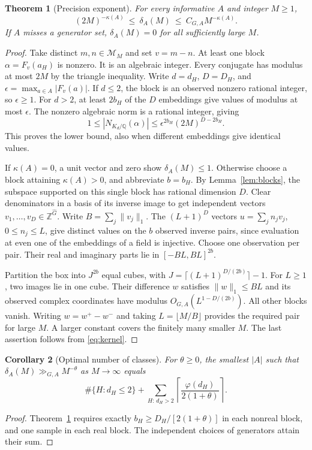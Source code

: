 \documentclass[11pt]{article}
\newtheorem{theorem}{Theorem}
\newtheorem{corollary}[theorem]{Corollary}
\newcommand{\Q}{\mathbb Q}
\newcommand{\Z}{\mathbb Z}
\newcommand{\calM}{\mathcal M}
\begin{document}
\newpage
\begin{theorem}[Precision exponent]\label{th:sep}
For every informative $A$ and integer $M\ge1$,
\[
 (2M)^{-\kappa(A)}\ \le\ \delta_A(M)\ \le\ C_{G,A}M^{-\kappa(A)} .
\]
If $A$ misses a generator set, $\delta_A(M)=0$ for all sufficiently large $M$.
\end{theorem}
\begin{proof}
Take distinct $m,n\in\calM_M$ and set $v=m-n$. At least one block $\alpha=F_v(a_H)$ is nonzero. It is an algebraic integer. Every conjugate has modulus at most $2M$ by the triangle inequality. Write $d=d_H$, $D=D_H$, and $\epsilon=\max_{a\in A}|F_v(a)|$. If $d\le2$, the block is an observed nonzero rational integer, so $\epsilon\ge1$. For $d>2$, at least $2b_H$ of the $D$ embeddings give values of modulus at most $\epsilon$. The nonzero algebraic norm is a rational integer, giving
\[
  1\le |N_{K_d/\Q}(\alpha)|\le\epsilon^{2b_H}(2M)^{D-2b_H}.
\]
This proves the lower bound, also when different embeddings give identical values.

If $\kappa(A)=0$, a unit vector and zero show $\delta_A(M)\le1$. Otherwise choose a block attaining $\kappa(A)>0$, and abbreviate $b=b_H$. By Lemma~\ref{lem:blocks}, the subspace supported on this single block has rational dimension $D$. Clear denominators in a basis of its inverse image to get independent vectors $v_1,\ldots,v_D\in\Z^{\widehat G}$. Write $B=\sum_j\|v_j\|_1$. The $(L+1)^D$ vectors $u=\sum_j n_jv_j$, $0\le n_j\le L$, give distinct values on the $b$ observed inverse pairs, since evaluation at even one of the embeddings of a field is injective. Choose one observation per pair. Their real and imaginary parts lie in $[-BL,BL]^{2b}$.

Partition the box into $J^{2b}$ equal cubes, with $J=\lceil(L+1)^{D/(2b)}\rceil-1$. For $L\ge1$, two images lie in one cube. Their difference $w$ satisfies $\|w\|_1\le BL$ and its observed complex coordinates have modulus $O_{G,A}(L^{1-D/(2b)})$. All other blocks vanish. Writing $w=w^+-w^-$ and taking $L=\lfloor M/B\rfloor$ provides the required pair for large $M$. A larger constant covers the finitely many smaller $M$. The last assertion follows from \eqref{eq:kernel}.
\end{proof}

\begin{corollary}[Optimal number of classes]
For $\theta\ge0$, the smallest $|A|$ such that $\delta_A(M)\gg_{G,A}M^{-\theta}$ as $M\to\infty$ equals
\[
 \#\{H:d_H\le2\}
   +\sum_{H:\,d_H>2}\left\lceil\frac{\varphi(d_H)}{2(1+\theta)}\right\rceil .
\]
\end{corollary}
\begin{proof}
Theorem~\ref{th:sep} requires exactly $b_H\ge D_H/[2(1+\theta)]$ in each nonreal block, and one sample in each real block. The independent choices of generators attain their sum.
\end{proof}
\end{document}
